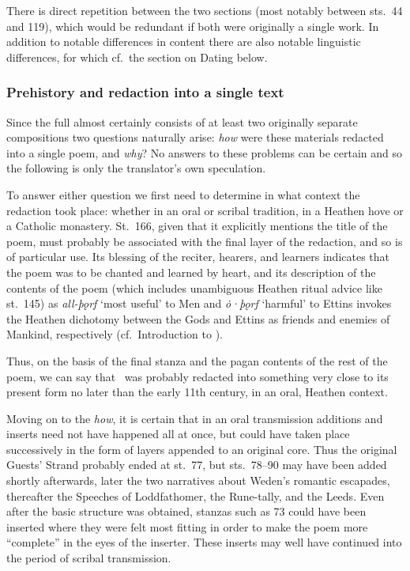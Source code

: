 There is direct repetition between the two sections (most notably between sts.~44 and 119), which would be redundant if both were originally a single work.  In addition to notable differences in content there are also notable linguistic differences, for which cf.~the section on Dating below.

\subsubsection{Prehistory and redaction into a single text}

Since the full  almost certainly consists of at least two originally separate compositions two questions naturally arise: \emph{how} were these materials redacted into a single poem, and \emph{why}?  No answers to these problems can be certain and so the following is only the translator’s own speculation.

To answer either question we first need to determine in what context the redaction took place: whether in an oral or scribal tradition, in a Heathen hove or a Catholic monastery.  St.~166, given that it explicitly mentions the title of the poem, must probably be associated with the final layer of the redaction, and so is of particular use.  Its blessing of the reciter, hearers, and learners indicates that the poem was to be chanted and learned by heart, and its description of the contents of the poem (which includes unambiguous Heathen ritual advice like st.~145) as \emph{all-þǫrf} ‘most useful’ to Men and \emph{ȯ·þǫrf} ‘harmful’ to Ettins invokes the Heathen dichotomy between the Gods and Ettins as friends and enemies of Mankind, respectively (cf.~Introduction to ).

Thus, on the basis of the final stanza and the pagan contents of the rest of the poem, we can say that \Havamal\ was probably redacted into something very close to its present form no later than the early 11th century, in an oral, Heathen context.

Moving on to the \emph{how}, it is certain that in an oral transmission additions and inserts need not have happened all at once, but could have taken place successively in the form of layers appended to an original core.  Thus the original Guests’ Strand probably ended at st.~77, but sts.~78--90 may have been added shortly afterwards, later the two narratives about Weden’s romantic escapades, thereafter the Speeches of Loddfathomer, the Rune-tally, and the Leeds.  Even after the basic structure was obtained, stanzas such as 73 could have been inserted where they were felt most fitting in order to make the poem more “complete” in the eyes of the inserter.  These inserts may well have continued into the period of scribal transmission.

